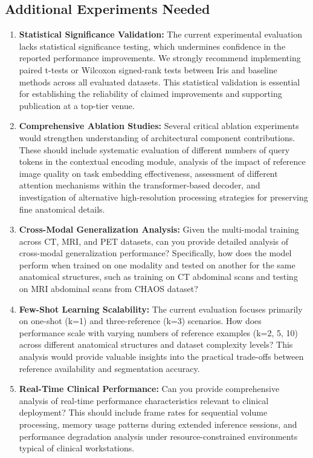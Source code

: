 \subsection{Additional Experiments Needed}
\begin{enumerate}
    \item \textbf{Statistical Significance Validation:} The current experimental evaluation lacks statistical significance testing, which undermines confidence in the reported performance improvements. We strongly recommend implementing paired t-tests or Wilcoxon signed-rank tests between Iris and baseline methods across all evaluated datasets. This statistical validation is essential for establishing the reliability of claimed improvements and supporting publication at a top-tier venue.
    
    \item \textbf{Comprehensive Ablation Studies:} Several critical ablation experiments would strengthen understanding of architectural component contributions. These should include systematic evaluation of different numbers of query tokens in the contextual encoding module, analysis of the impact of reference image quality on task embedding effectiveness, assessment of different attention mechanisms within the transformer-based decoder, and investigation of alternative high-resolution processing strategies for preserving fine anatomical details.
    
    \item \textbf{Cross-Modal Generalization Analysis:} Given the multi-modal training across CT, MRI, and PET datasets, can you provide detailed analysis of cross-modal generalization performance? Specifically, how does the model perform when trained on one modality and tested on another for the same anatomical structures, such as training on CT abdominal scans and testing on MRI abdominal scans from CHAOS dataset?
    
    \item \textbf{Few-Shot Learning Scalability:} The current evaluation focuses primarily on one-shot (k=1) and three-reference (k=3) scenarios. How does performance scale with varying numbers of reference examples (k=2, 5, 10) across different anatomical structures and dataset complexity levels? This analysis would provide valuable insights into the practical trade-offs between reference availability and segmentation accuracy.
    
    \item \textbf{Real-Time Clinical Performance:} Can you provide comprehensive analysis of real-time performance characteristics relevant to clinical deployment? This should include frame rates for sequential volume processing, memory usage patterns during extended inference sessions, and performance degradation analysis under resource-constrained environments typical of clinical workstations.
\end{enumerate}

